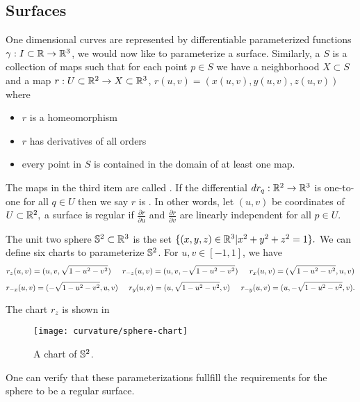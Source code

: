 \subsection{Surfaces}


One dimensional curves are represented by differentiable 
parameterized functions $\gamma:I\subset \mathbb{R}\to \mathbb{R}^3$,
we would now like to parameterize a surface.
Similarly, a  $S$ is a collection of maps such that
 for each point $p\in S$ we have a neighborhood $X\subset S$
 and a map $r:U\subset \mathbb{R}^2 \to X\subset \mathbb{R}^3$, $r(u,v)=(x(u,v),y(u,v),z(u,v))$
 where
 \begin{itemize}
 \item  $r$ is a homeomorphism
 \item $r$ has derivatives of all orders
 \item every point in $S$ is contained in the domain of at least one map.

\end{itemize}
The maps in the third item are called .
If the differential $dr_q:\mathbb{R}^2\to \mathbb{R}^3$ is one-to-one for all $q\in U$ then
we say $r$ is . In other words, let $(u,v)$ be coordinates of $U\subset \mathbb{R}^2,$
a surface is regular if $\frac{\partial r}{\partial u}$
and $\frac{\partial r}{\partial v}$ are linearly independent for all $p\in U$.


\begin{example}\label{ex:sphere-charts}

The unit two sphere $\mathbb{S}^2\subset \mathbb{R}^3$ is the set $\{(x,y,z)\in \mathbb{R}^3 | x^2+y^2+z^2=1\}.$
We can define six charts to parameterize $\mathbb{S}^2$.
For $u,v\in[-1,1]$, we have
$$r_{z}(u,v)=(u,v,\sqrt{1-u^2-v^2}) \hspace{.5cm}  r_{-z}(u,v)=(u,v,-\sqrt{1-u^2-v^2}) \hspace{.5cm}  r_{x}(u,v)=(\sqrt{1-u^2-v^2},u,v) $$
$$r_{-x}(u,v)=(-\sqrt{1-u^2-v^2},u,v) \hspace{.5cm}  r_{y}(u,v)=(u,\sqrt{1-u^2-v^2},v) \hspace{.5cm}   r_{-y}(u,v)=(u,-\sqrt{1-u^2-v^2},v). $$

The chart $r_{z}$ is shown in 

\begin{figure}[htb]
	\centering
	\texttt{[image: curvature/sphere-chart]}
	\caption{A chart of $\mathbb{S}^2$.}
	\label{fig:sphere-chart}
\end{figure}

One can verify that these parameterizations fullfill the requirements
for the sphere to be a regular surface.

\end{example}


